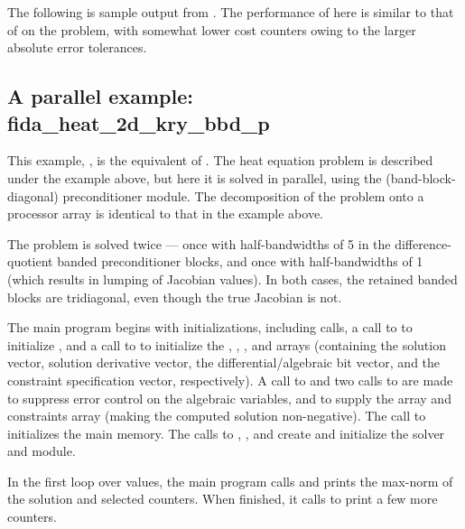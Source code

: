 The following is sample output from .
The performance of {\fida} here is similar to that of {\ida} on
the  problem, with somewhat lower cost counters owing to
the larger absolute error tolerances.



\subsection{A parallel example: fida\_heat\_2d\_kry\_bbd\_p}\label{ss:fidaHeat2D_bbd_p}

This example, , is the {\F} equivalent of
.  The heat equation problem is described
under the  example above, but here it is solved in
parallel, using the {\idabbdpre} (band-block-diagonal) preconditioner
module.  The decomposition of the problem onto a processor array is
identical to that in the  example above.

The problem is solved twice --- once with half-bandwidths of 5 in the
difference-quotient banded preconditioner blocks, and once with
half-bandwidths of 1 (which results in lumping of Jacobian values).
In both cases, the retained banded blocks are tridiagonal, even though
the true Jacobian is not.

The main program begins with initializations, including {\mpi} calls,
a call to  to initialize {\nvecp}, and a call to
 to initialize the , , , and
 arrays (containing the solution vector, solution derivative vector,
the differential/algebraic bit vector, and the constraint specification
vector, respectively).  A call to  and two calls to
 are made to suppress error control on the algebraic
variables, and to supply the  array and constraints array (making
the computed solution non-negative).  The call to 
initializes the {\fida} main memory.  The calls to
, ,  and
 create and initialize the {\spgmr} solver and {\fidabbd} module.

In the first loop over  values, the main program calls 
and prints the max-norm of the solution and selected counters.  When finished,
it calls  to print a few more counters.

